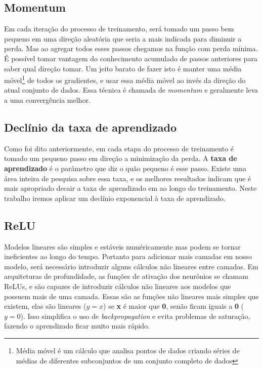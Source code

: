\subsection{Momentum}

Em cada iteração do processo de treinamento, será tomado um passo bem
pequeno em uma direção aleatória que seria a mais indicada para
diminuir a perda. Mas ao agregar todos esses passos chegamos na função
com perda mínima. É possível tomar vantagem do conhecimento acumulado
de passos anteriores para saber qual direção tomar. Um jeito barato de
fazer isto é manter uma média móvel\footnote{Média móvel é um cálculo
  que analisa pontos de dados criando séries de médias de diferentes
  subconjuntos de um conjunto completo de dados} de todos os
gradientes, e usar essa média móvel ao invés da direção do atual
conjunto de dados. Essa técnica é chamada de \textit{momentum} e
geralmente leva a uma convergência melhor.

\subsection{Declínio da taxa de aprendizado}

Como foi dito anteriormente, em cada etapa do processo de treinamento
é tomado um pequeno passo em direção a minimização da perda. A {\bf
  taxa de aprendizado} é o parâmetro que diz o quão pequeno é esse
passo. Existe uma área inteira de pesquisa sobre essa taxa, e os
melhores resultados indicam que é mais apropriado decair a taxa de
aprendizado em ao longo do treinamento. Neste trabalho iremos aplicar
um declínio exponencial à taxa de aprendizado.\cite{Zeiler}

\subsection{ReLU}

Modelos lineares são simples e estáveis numéricamente mas podem se
tornar ineficientes ao longo do tempo. Portanto para adicionar mais
camadas em nosso modelo, será necessário introduzir alguns cálculos
não lineares entre camadas. Em arquiteturas de profundidade, as
funções de ativação dos neurônios se chamam ReLUs, e são capazes de
introduzir cálculos não lineares aos modelos que possuem mais de uma
camada. Essas são as funções não lineares mais simples que
existem, elas são lineares ($y=x$) se {\bf x} é maior que {\bf 0},
senão ficam iguais a {\bf 0} ($y=0$). Isso simplifica o uso de
\textit{backpropagation} e evita problemas de saturação, fazendo o
aprendizado ficar muito mais rápido.

